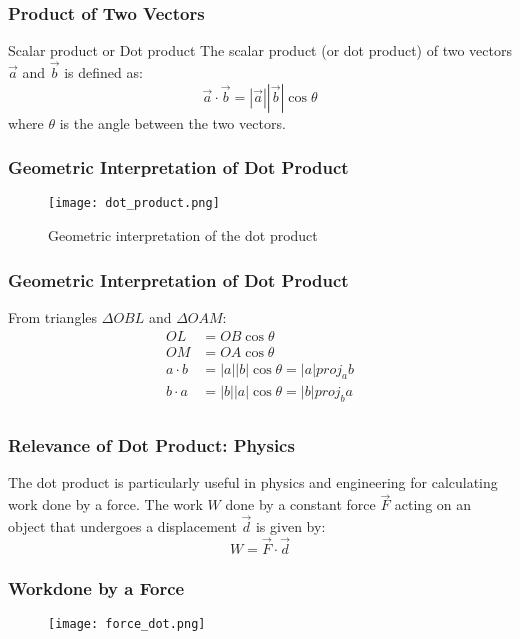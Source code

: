 \begin{frame}
    \frametitle{Product of Two Vectors}
    \begin{block}{Scalar product or Dot product}
        The scalar product (or dot product) of two vectors \(\vec{a}\) and \(\vec{b}\) is defined as:
        \[
        \vec{a} \cdot \vec{b} = |\vec{a}| |\vec{b}| \cos \theta
        \]
        where \(\theta\) is the angle between the two vectors.
        
    \end{block}
\end{frame}

\begin{frame}
    \frametitle{Geometric Interpretation of Dot Product}
    \begin{figure}
        \centering
        \texttt{[image: dot\_product.png]}
        \caption{Geometric interpretation of the dot product}
    \end{figure}

\end{frame}

\begin{frame}
    \frametitle{Geometric Interpretation of Dot Product}
    From triangles \(\Delta OBL\) and \(\Delta OAM\):
    \begin{align*}
        OL &= OB \cos \theta \\
        OM &= OA \cos \theta  \\
        a \cdot b  &= |a| |b| \cos \theta = |a| proj_a b \\
        b \cdot a  &= |b| |a| \cos \theta = |b| proj_b a \\
    \end{align*}
\end{frame} 

\begin{frame}
\frametitle{Relevance of Dot Product: Physics}
The dot product is particularly useful in physics and engineering for calculating work done by a force. The work \(W\) done by a constant force \(\vec{F}\) acting on an object that undergoes a displacement \(\vec{d}\) is given by:
\[
W = \vec{F} \cdot \vec{d}
\]
\end{frame}

\begin{frame}
    \frametitle{Workdone by a Force}
    \begin{figure}
        \centering
        \texttt{[image: force\_dot.png]}
    \end{figure}
\end{frame}

